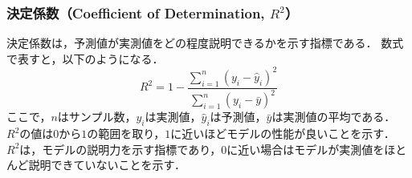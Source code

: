 \subsubsection*{決定係数（Coefficient of Determination, $R^2$）}
決定係数は，予測値が実測値をどの程度説明できるかを示す指標である．  
数式で表すと，以下のようになる．
\begin{equation}
  \label{eq:r2}
  R^2 = 1 - \frac{\sum_{i=1}^{n} (y_i - \hat{y}_i)^2}{\sum_{i=1}^{n} (y_i - \bar{y})^2}
\end{equation}
ここで，$n$はサンプル数，$y_i$は実測値，$\hat{y}_i$は予測値，$\bar{y}$は実測値の平均である．
$R^2$の値は$0$から$1$の範囲を取り，$1$に近いほどモデルの性能が良いことを示す．
$R^2$は，モデルの説明力を示す指標であり，$0$に近い場合はモデルが実測値をほとんど説明できていないことを示す．